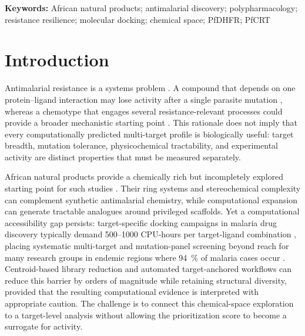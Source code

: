 \documentclass[journal=jcisd8,manuscript=article]{achemso}
\begin{document}
\noindent\textbf{Keywords:} African natural products; antimalarial discovery; polypharmacology; resistance resilience; molecular docking; chemical space; PfDHFR; PfCRT

\section{Introduction}\label{sec:intro}
Antimalarial resistance is a systems problem \cite{WHO2024MalariaReport,Ariey2014,Ashley2018}. A compound that depends on one protein--ligand interaction may lose activity after a single parasite mutation \cite{Fidock2000}, whereas a chemotype that engages several resistance-relevant processes could provide a broader mechanistic starting point \cite{Wells2015,SiqueiraNeto2023,Ryszkiewicz2026MTDL,Trapotsi2022MoA}. This rationale does not imply that every computationally predicted multi-target profile is biologically useful: target breadth, mutation tolerance, physicochemical tractability, and experimental activity are distinct properties that must be measured separately.

African natural products provide a chemically rich but incompletely explored starting point for such studies \cite{Newman2007,NtieKang2018,Simoben2023,Cheuka2020}. Their ring systems and stereochemical complexity can complement synthetic antimalarial chemistry, while computational expansion can generate tractable analogues around privileged scaffolds. Yet a computational accessibility gap persists: target-specific docking campaigns in malaria drug discovery typically demand \numrange{500}{1000} CPU-hours per target-ligand combination \cite{Trott2009,Eberhardt2021}, placing systematic multi-target and mutation-panel screening beyond reach for many research groups in endemic regions where \qty{94}{\percent} of malaria cases occur \cite{WHO2024MalariaReport}. Centroid-based library reduction and automated target-anchored workflows can reduce this barrier by orders of magnitude while retaining structural diversity, provided that the resulting computational evidence is interpreted with appropriate caution. The challenge is to connect this chemical-space exploration to a target-level analysis without allowing the prioritization score to become a surrogate for activity.
\end{document}
